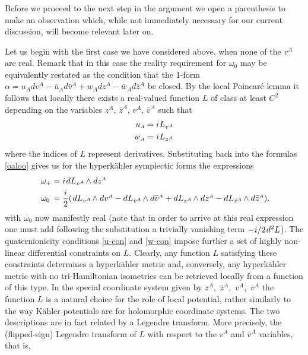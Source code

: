 \documentclass[11pt]{amsart}
\theoremstyle{remark}
\theoremstyle{remark}
\theoremstyle{definition}
\theoremstyle{definition}
\theoremstyle{definition}
\newcommand{\0}{{\scriptstyle 0'}} %
\newcommand{\1}{{\scriptstyle 1'}}
\newcommand{\A}{{\scriptscriptstyle A}} %
\newcommand{\pt}{\hspace{1pt}} %
\newcommand{\hp}{\hspace{0.5pt}} %
\newcommand{\npt}{\hspace{-1pt}} %
\begin{document}
\subsubsection{}


Before we proceed to the next step in the argument we open a parenthesis to make an observation which, while not immediately necessary for our current discussion, will become relevant later on. 

Let us begin with the first case we have considered above, when none of the $v^{\A}$ are real. Remark that in this case the reality requirement for $\omega_0$ may be equivalently restated as the condition that the 1-form \mbox{$\alpha = u_{\A} dv^{\A} - \bar{u}_{\A} d\bar{v}^{\A} + w_{\A} dz^{\A} - \bar{w}_{\A} d\bar{z}^{\A}$} be closed. By the local Poincar\'e lemma it follows that locally there exists a real-valued function $L$ of class at least $C^2$ depending on the variables $z^{\A}$, $\bar{z}^{\A}$, $v^{\A}$, $\bar{v}^{\A}$ such that
\begin{equation} \label{uw-L_1}
\begin{aligned}
u_{\A} & = i \hp L_{v^{A}} \\[0pt]
w_{\A} & = i \hp L_{z^{A}}
\end{aligned}
\end{equation} 
where the indices of $L$ represent derivatives. Substituting back into the formulas \eqref{oaloo} gives us for the hyperk\"ahler symplectic forms the expressions
\begin{equation} \label{HK-sym-L}
\begin{aligned}
\omega_+ & = i \pt dL_{v^{\A}} \npt \wedge dz^{\A}\\
\omega_0 \hspace{1.9pt} & = \frac{i}{2} (\pt dL_{v^{\A}} \npt \wedge dv^{\A} - dL_{\bar{v}^{\A}} \npt \wedge d\bar{v}^{\A} + dL_{z^{\A}} \npt \wedge dz^{\A} - dL_{\bar{z}^{\A}} \npt \wedge d\bar{z}^{\A}) \rlap{.}
\end{aligned}
\end{equation}
with $\omega_0$ now manifestly real  (note that in order to arrive at this real expression one must add following the substitution a trivially vanishing term $- \hp i/2\pt d^2L$). The quaternionicity conditions \eqref{u-con} and \eqref{w-con} impose further a set of highly non-linear differential constraints on $L$. Clearly, any function $L$ satisfying these constraints determines a hyperk\"ahler metric and, conversely, any hyperk\"ahler metric with no tri-Hamiltonian isometries can be retrieved locally from a function of this type. In the special coordinate system given by \mbox{$z^{\A}$, $\bar{z}^{\A}$, $v^{\A}$, $\bar{v}^{\A}$} the function $L$ is a natural choice for the role of local potential, rather similarly to the way K\"ahler potentials are for holomorphic coordinate systems. The two descriptions are in fact related by a Legendre transform. More precisely, the (flipped-sign) Legendre transform of $L$ with respect to the $v^{\A}$ and $\bar{v}^{\A}$ variables, that is, 
\end{document}
